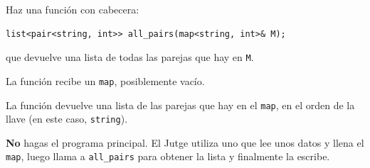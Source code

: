 

\Statement

Haz una función con cabecera:

\begin{verbatim}
list<pair<string, int>> all_pairs(map<string, int>& M);
\end{verbatim}

que devuelve una lista de todas las parejas que hay en \verb|M|.

\Input

La función recibe un \verb|map|, posiblemente vacío.

\Output

La función devuelve una lista de las parejas que hay en el 
\verb|map|, en el orden de la llave (en este caso, 
\verb|string|).

\Observation

\textbf{No} hagas el programa principal. El Jutge utiliza uno 
que lee unos datos y llena el \verb|map|, luego llama a 
\verb|all_pairs| para obtener la lista y finalmente la 
escribe.

\SampleTwoCol
